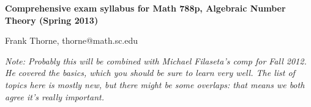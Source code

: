 \documentclass[12pt]{article}
\begin{document}
\setlength{\topmargin}{-2mm}





\begin{center}{\bf Comprehensive exam syllabus for Math 788p, Algebraic Number Theory (Spring 2013)}
\end{center}
\begin{center}Frank Thorne, thorne@math.sc.edu
\end{center}

{\itshape Note: Probably this will be combined with Michael Filaseta's comp for Fall 2012. He covered
the basics, which you should be sure to learn very well. The list of topics here is mostly new, but there
might be some overlaps: that means we both agree it's really important.}
\end{document}
